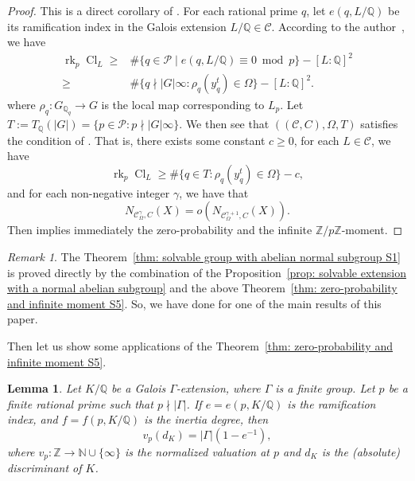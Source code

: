 \documentclass[12pt,a4paper]{amsart}
\numberwithin{equation}{section}%
\theoremstyle{plain}%
\newtheorem{lemma}[theorem]{Lemma}%
\theoremstyle{definition}%
\theoremstyle{remark}%
\newtheorem*{remark}{Remark}%
\begin{document}
    \begin{proof}
    	This is a direct corollary of \cite[Theorem 3.14]{wang2026invariant}.
    	For each rational prime $q$, let $e(q,L/\mathbb{Q})$ be its ramification index in the Galois extension $L/\mathbb{Q}\in\mathcal{C}$.
    	According to the author~\cite[Theorem 3.1]{wang2026invariant}, we have 
    	\begin{align*}
    		\operatorname{rk}_{p}\operatorname{Cl}_{L}\geq&\#\{q\in\mathcal{P}\mid e(q,L/\mathbb{Q})\equiv 0 \bmod{p}\}-[L:\mathbb{Q}]^{2} \\
    		\geq&\#\{q\nmid\lvert G\rvert\infty:\rho_{q}(y_{q}^{t})\in\Omega\}-[L:\mathbb{Q}]^{2}.
    	\end{align*}
    	where $\rho_{q}:G_{\mathbb{Q}_{q}}\to G$ is the local map corresponding to $L_{p}$.
    	Let $T:=T_{\mathbb{Q}}(\lvert G\rvert)=\{p\in\mathcal{P}:p\nmid\lvert G\rvert\infty\}$.
    	We then see that $((\mathcal{C},C),\Omega,T)$ satisfies the condition of \cite[Theorem 3.14]{wang2026invariant}.
    	That is, there exists some constant $c\geq0$, for each $L\in\mathcal{C}$, we have
    	\begin{equation*}
    		\operatorname{rk}_{p}\operatorname{Cl}_{L}\geq\#\{q\in T:\rho_{q}(y_{q}^{t})\in\Omega\}-c,
    	\end{equation*} 
    	and for each non-negative integer $\gamma$, we have that
    	\begin{equation*}
    		N_{\mathcal{C}_{\Omega}^{\gamma},C}(X)=o(N_{\mathcal{C}_{\Omega}^{\gamma+1},C}(X)).
    	\end{equation*}
    	Then \cite[Theorem 3.14]{wang2026invariant} implies immediately the zero-probability and the infinite $\mathbb{Z}/p\mathbb{Z}$-moment.
    \end{proof}
    \begin{remark}
    	The Theorem~\ref{thm: solvable group with abelian normal subgroup S1} is proved directly by the combination of the Proposition~\ref{prop: solvable extension with a normal abelian subgroup} and the above Theorem~\ref{thm: zero-probability and infinite moment S5}.
    	So, we have done for one of the main results of this paper.
    \end{remark}
    Then let us show some applications of the Theorem~\ref{thm: zero-probability and infinite moment S5}.
    \begin{lemma}
    	Let $K/\mathbb{Q}$ be a Galois $\Gamma$-extension, where $\Gamma$ is a finite group.
    	Let $p$ be a finite rational prime such that $p\nmid\lvert\Gamma\rvert$.
    	If $e=e(p,K/\mathbb{Q})$ is the ramification index, and $f=f(p,K/\mathbb{Q})$ is the inertia degree, then
    	\begin{equation*}
    		v_{p}(d_{K})=\lvert\Gamma\rvert(1-e^{-1}),%
    	\end{equation*}
    	where $v_{p}:\mathbb{Z}\to\mathbb{N}\cup\{\infty\}$ is the normalized valuation at $p$ and $d_{K}$ is the (absolute) discriminant of $K$.
    \end{lemma}
\end{document}
